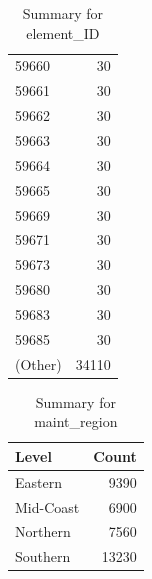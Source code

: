 \begin{table}[ht]
\begin{tabular}{lr}
  59660 &  30 \\ 
  59661 &  30 \\ 
  59662 &  30 \\ 
  59663 &  30 \\ 
  59664 &  30 \\ 
  59665 &  30 \\ 
  59669 &  30 \\ 
  59671 &  30 \\ 
  59673 &  30 \\ 
  59680 &  30 \\ 
  59683 &  30 \\ 
  59685 &  30 \\ 
  (Other) & 34110 \\ 
   \hline
\end{tabular}
\caption{Summary for element_ID} 
\label{tab: element_ID}
\end{table}
\begin{table}[ht]
\centering
\begin{tabular}{lr}
  \hline
Level & Count \\ 
  \hline
Eastern & 9390 \\ 
  Mid-Coast & 6900 \\ 
  Northern & 7560 \\ 
  Southern & 13230 \\ 
   \hline
\end{tabular}
\caption{Summary for maint_region} 
\label{tab: maint_region}
\end{table}
